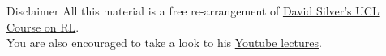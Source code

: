 \bgroup
\begin{frame}{Disclaimer}
All this material is a free re-arrangement of \href{http://www0.cs.ucl.ac.uk/staff/d.silver/web/Teaching.html}{David Silver's UCL Course on RL}.
\\
You are also encouraged to take a look to his \href{https://www.youtube.com/watch?v=2pWv7GOvuf0}{Youtube lectures}.
\end{frame}
\egroup